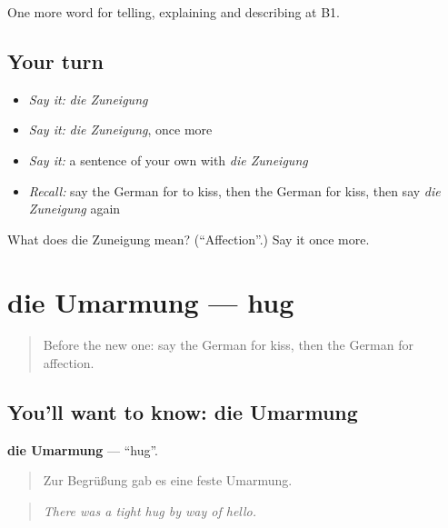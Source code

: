 \begin{grammarlens}[title={What you've built}]
One more word for telling, explaining and describing at B1.
\end{grammarlens}

\subsection*{Your turn}
\begin{itemize}
\raggedright
  \item \emph{Say it:} \emph{die Zuneigung}
  \item \emph{Say it:} \emph{die Zuneigung}, once more
  \item \emph{Say it:} a sentence of your own with \emph{die Zuneigung}
  \item \emph{Recall:} say the German for to kiss, then the German for kiss, then say \emph{die Zuneigung} again
\end{itemize}

\begin{tcolorbox}[breakable,colback=teal!4,colframe=teal!35!black,title={Before you move on}]
What does die Zuneigung mean? (\textquotedblleft{}Affection\textquotedblright{}.) Say it once more.
\end{tcolorbox}
\section[die Umarmung]{die Umarmung — hug}

\label{lesson:GE-C493-umarmung}



\begin{quote}
Before the new one: say the German for kiss, then the German for affection.
\end{quote}

\subsection*{You'll want to know: die Umarmung}
\textbf{die Umarmung} — \textquotedblleft{}hug\textquotedblright{}.

\begin{quote}
Zur Begrüßung gab es eine feste Umarmung.
\end{quote}

\begin{quote}
\emph{There was a tight hug by way of hello.}
\end{quote}

